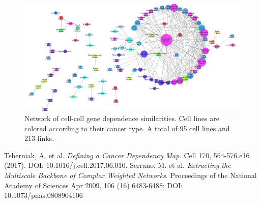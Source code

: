 \documentclass[12pt]{article}
\begin{document}
\begin{figure}[h]
\centering
\includegraphics[width=0.9\columnwidth]{fig1.pdf}
 \caption*{\scriptsize Network of cell-cell gene dependence similarities. Cell lines are colored according to their cancer type. A total of 95 cell lines and 213 links.}
\end{figure}

\vspace{-4ex}
 
\begin{thebibliography}{99}
\vspace{-2ex}
\footnotesize
{} Tsherniak, A. et al. {\textit{Defining a Cancer Dependency Map.}} Cell 170, 564-576.e16 (2017). DOI: 10.1016/j.cell.2017.06.010.
\vspace{-2ex}
 Serrano, M. et al. {\textit{Extracting the Multiscale Backbone of Complex Weighted Networks}}. Proceedings of the National Academy of Sciences Apr 2009, 106 (16) 6483-6488; DOI: 10.1073/pnas.0808904106

\end{thebibliography}
\end{document}
